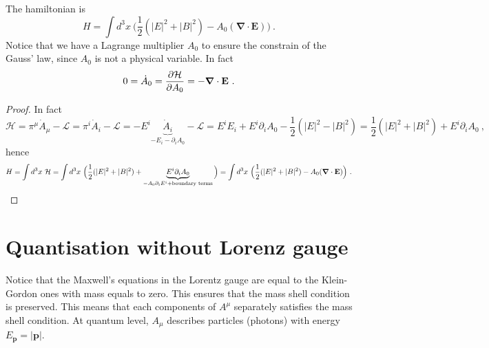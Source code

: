     The hamiltonian is 
    \begin{equation*}
        H = \int d^3 x ~\Big ( \frac{1}{2}  (|E|^2 + |B|^2) - A_0 (\boldsymbol \nabla \cdot \mathbf E) \Big) ~.
    \end{equation*}
    Notice that we have a Lagrange multiplier $A_0$ to ensure the constrain of the Gauss' law, since $A_0$ is not a physical variable. In fact 
    \begin{equation*}
        0 = \dot A_0 = \frac{\partial\mathcal H}{\partial A_0} = - \boldsymbol \nabla \cdot \mathbf E ~. 
    \end{equation*}
    \begin{proof}
        In fact 
        \begin{equation*}
            \mathcal H = \pi^\mu \dot A_\mu - \mathcal L = \pi^i \dot A_i - \mathcal L = - E^i \underbrace{\dot A_i}_{- E_i - \partial_i A_0} - \mathcal L = E^i E_i + E^i \partial_i A_0 - \frac{1}{2} (|E|^2 - |B|^2) = \frac{1}{2} (|E|^2 + |B|^2) + E^i \partial_i A_0 ~,
        \end{equation*}
        hence 
        \begin{equation}
            H = \int d^3 x ~ \mathcal H = \int d^3 x ~ \Big ( \frac{1}{2} (|E|^2 + |B|^2) + \underbrace{E^i \partial_i A_0}_{- A_0 \partial_i E^i + \textnormal{boundary terms}} \Big) = \int d^3 x ~ \Big ( \frac{1}{2} (|E|^2 + |B|^2) - A_0 (\boldsymbol \nabla \cdot \mathbf E) \Big) ~.
        \end{equation}
    \end{proof}

\section{Quantisation without Lorenz gauge}

    Notice that the Maxwell's equations in the Lorentz gauge are equal to the Klein-Gordon ones with mass equals to zero. This ensures that the mass shell condition is preserved. This means that each components of $A^\mu$ separately satisfies the mass shell condition. At quantum level, $A_\mu$ describes particles (photons) with energy $E_{\mathbf p} = |\mathbf p|$.

